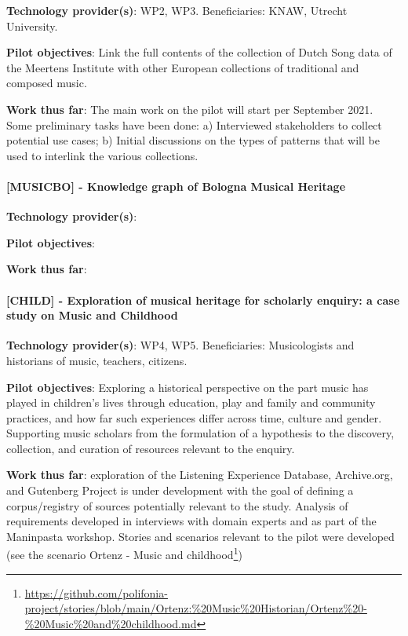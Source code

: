 \textbf{Technology provider(s)}: WP2, WP3. Beneficiaries: KNAW, Utrecht University.

\textbf{Pilot objectives}: Link the full contents of the collection of Dutch Song 
data of the Meertens Institute with other European collections of 
traditional and composed music.

\textbf{Work thus far}: The main work on the pilot will start per September 2021. 
Some preliminary tasks have been done: a) Interviewed stakeholders to collect potential use cases; b) Initial discussions on the types of patterns that will be used to interlink the various collections.

\paragraph*{[MUSICBO] - Knowledge graph of Bologna Musical Heritage}\label{sec:pilot:tunes}


\textbf{Technology provider(s)}: 

\textbf{Pilot objectives}:

\textbf{Work thus far}:

\paragraph*{[CHILD] - Exploration of musical heritage for scholarly enquiry: a case study on Music and Childhood}\label{sec:pilot:child}

\textbf{Technology provider(s)}: WP4, WP5. Beneficiaries: Musicologists and historians of music, teachers, citizens. 

\textbf{Pilot objectives}: Exploring a historical perspective on the part music has played in children’s lives through education, play and family and community practices, and how far such experiences differ across time, culture and gender. 
Supporting music scholars from the formulation of a hypothesis to the discovery, collection, and curation of resources relevant to the enquiry. 

\textbf{Work thus far}: exploration of the Listening Experience Database, Archive.org, and Gutenberg Project is under development with the goal of defining a corpus/registry of sources potentially relevant to the study. Analysis of requirements developed in interviews with domain experts and as part of the Maninpasta workshop. Stories and scenarios relevant to the pilot were developed (see the scenario Ortenz - Music and childhood\footnote{\url{https://github.com/polifonia-project/stories/blob/main/Ortenz:\%20Music\%20Historian/Ortenz\%20-\%20Music\%20and\%20childhood.md}})

